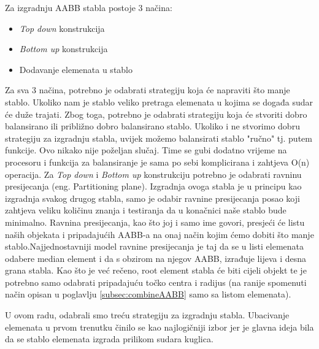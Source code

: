 Za izgradnju AABB stabla postoje 3 načina\cite{3}: 
\begin{itemize}
	\item \emph{Top down} konstrukcija
	\item \emph{Bottom up} konstrukcija
	\item Dodavanje elemenata u stablo
\end{itemize}
Za sva 3 načina, potrebno je odabrati strategiju koja će napraviti što manje stablo. Ukoliko nam je stablo veliko pretraga elemenata u kojima se događa sudar će duže trajati. Zbog toga, potrebno je odabrati strategiju koja će stvoriti dobro balansirano ili približno dobro balansirano stablo\cite{1}. Ukoliko i ne stvorimo dobru strategiju za izgradnju stabla, uvijek možemo balansirati stablo "ručno" tj. putem funkcije. Ovo nikako nije poželjan slučaj. Time se gubi dodatno vrijeme na procesoru i funkcija za balansiranje je sama po sebi komplicirana i zahtjeva O(n) operacija. Za \emph{Top down} i \emph{Bottom up} konstrukciju potrebno je odabrati ravninu presijecanja (eng. Partitioning plane). Izgradnja ovoga stabla je u principu kao izgradnja svakog drugog stabla, samo je odabir ravnine presijecanja posao koji zahtjeva veliku količinu znanja i testiranja da u konačnici naše stablo bude minimalno. 
Ravnina presijecanja, kao što joj i samo ime govori, presjeći će listu naših objekata i pripadajućih AABB-a na onaj način kojim ćemo dobiti što manje stablo.Najjednostavniji model ravnine presijecanja je taj da se u listi elemenata odabere median element i da s obzirom na njegov AABB, izrađuje lijeva i desna grana stabla. Kao što je već rečeno, root element stabla će biti cijeli objekt te je potrebno samo odabrati pripadajuću točko centra i radijus (na ranije spomenuti način opisan u poglavlju \ref{subsec:combineAABB} samo sa listom elemenata).

U ovom radu, odabrali smo treću strategiju za izgradnju stabla. Ubacivanje elemenata u prvom trenutku činilo se kao najlogičniji izbor jer je glavna ideja bila da se stablo elemenata izgrada prilikom sudara kuglica.

